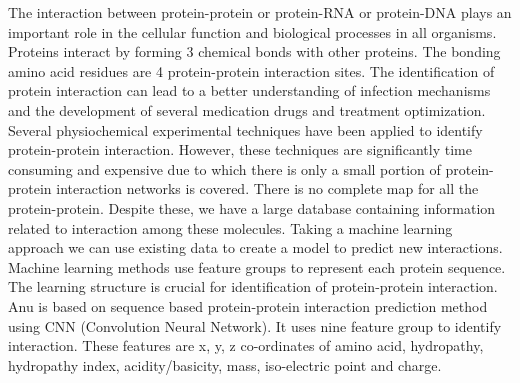 \documentclass[../main.tex]{subfiles}
\begin{document}


The interaction between protein-protein or protein-RNA or protein-DNA
plays an important role in the cellular function and biological processes
in all organisms. Proteins interact by forming 3 chemical bonds with other
proteins. The bonding amino acid residues are 4 protein-protein
interaction sites. The identification of protein interaction can lead to a
better understanding of infection mechanisms and the development of several
medication drugs and treatment optimization. \\
Several physiochemical experimental techniques have been applied to
identify protein-protein interaction. However, these techniques are
significantly time consuming and expensive due to which there is only
a small portion of protein-protein interaction networks is covered.
There is no complete map for all the protein-protein. Despite these,
we have a large database containing information related to interaction
among these molecules. Taking a machine learning approach we can use
existing data to create a model to predict new interactions. \\
Machine learning methods use feature groups to represent each protein
sequence. The learning structure is crucial for identification of
protein-protein interaction. Anu is based on sequence based protein-protein
interaction prediction method using CNN (Convolution Neural Network).
It uses nine feature group to identify interaction. These features are
x, y, z co-ordinates of amino acid, hydropathy, hydropathy index,
acidity/basicity, mass, iso-electric point and charge.
\end{document}
